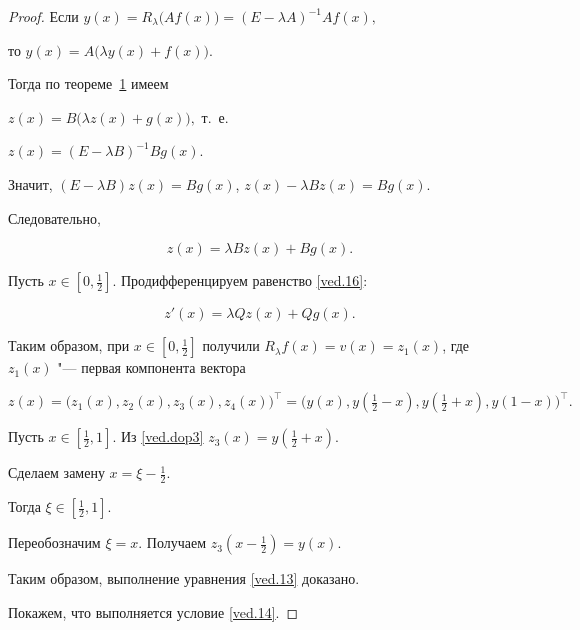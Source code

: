 \begin{proof}

Если $y(x)=R_{\lambda}\bigl(A f(x) \bigr)=(E-\lambda A)^{-1}Af (x),$

то $y(x)=A\bigl(\lambda y(x)+f(x)\bigr).$ 

Тогда по теореме~\hyperlink{ved:th1}{1} имеем 

$z(x)=B\bigl(\lambda z(x)+g(x)\bigr),$ т.~е. 

$z(x)=(E-\lambda B)^{-1}Bg (x).$

Значит, $(E-\lambda B)z(x)=Bg(x)$, $z(x)-\lambda Bz(x)=Bg(x)$. 

Следовательно, 

\begin{equation} 

\label{ved.16}

z(x)=\lambda B  z(x)+B g(x).

\end{equation}



Пусть  $x\in[0,\frac{1}{2}]$. Продифференцируем равенство \eqref{ved.16}:

$$

z'(x)=\lambda Q z(x)+Q g(x).

$$

Таким образом, при $x\in [0,\frac{1}{2}]$ получили $R_{\lambda}f(x)=v(x)=z_1(x)$, где $z_1(x)$  "--- первая компонента вектора 

\begin{equation}

\label{ved.dop3}

z(x)=\bigl(z_1(x),z_2(x),z_3(x),z_4(x)\bigr)^{\top}=

\bigl(y(x),y(\tfrac{1}{2}-x),y(\tfrac{1}{2}+x),y(1-x)\bigr)^{\top}.

\end{equation}

      

Пусть $x\in[\frac{1}{2},1]$. Из \eqref{ved.dop3} $z_3(x)=y(\frac{1}{2}+x)$. 

Сделаем замену $x=\xi -\frac{1}{2}$. 

Тогда $\xi\in\left[\frac{1}{2},1\right]$. 

Переобозначим $\xi=x$. Получаем $z_3(x-\frac{1}{2})=y(x).$ 

Таким образом, выполнение уравнения \eqref{ved.13} доказано.

   

Покажем, что выполняется условие \eqref{ved.14}. 


\end{proof}
